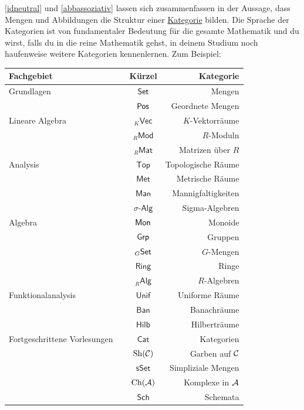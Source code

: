 \begin{vorschau} \label{kategorien}
    \cref{idneutral} und \cref{abbassoziativ} lassen sich zusammenfassen in der Aussage, dass Mengen und Abbildungen die Struktur einer \href{https://ncatlab.org/nlab/show/category}{Kategorie} bilden. Die Sprache der Kategorien ist von fundamentaler Bedeutung für die gesamte Mathematik und du wirst, falls du in die reine Mathematik gehst, in deinem Studium noch haufenweise weitere Kategorien kennenlernen. Zum Beispiel:
    \begin{longtable}{lccr}
    Fachgebiet & \phantom{Platzhalter} & Kürzel & \phantom{Platzhalterhalter} Kategorie \\
    \midrule
    Grundlagen && $\mathsf{Set}$ & Mengen \\ 
    && $\mathsf{Pos}$ & Geordnete Mengen \\[0.5em]
    Lineare Algebra && ${}_K\mathsf{Vec}$ & $K$-Vektorräume \\
    && ${}_R\mathsf{Mod}$ & $R$-Moduln \\
    && ${}_R\mathsf{Mat}$ & Matrizen über $R$ \\[0.5em]
    Analysis && $\mathsf{Top}$ & Topologische Räume \\
    && $\mathsf{Met}$ & Metrische Räume \\
    && $\mathsf{Man}$ & Mannigfaltigkeiten \\
    && $\sigma\textsf{-Alg}$ & Sigma-Algebren \\[0.5em]
    Algebra && $\mathsf{Mon}$ & Monoide \\
    && $\mathsf{Grp}$ & Gruppen \\
    && ${}_G\mathsf{Set}$ & $G$-Mengen \\
    && $\mathsf{Ring}$ & Ringe \\
    && ${}_R\mathsf{Alg}$ & $R$-Algebren \\[0.5em]
    Funktionalanalysis && $\mathsf{Unif}$ & Uniforme Räume \\
    && $\mathsf{Ban}$ & Banachräume \\
    && $\mathsf{Hilb}$ & Hilberträume \\[0.5em]
    Fortgeschrittene Vorlesungen && $\mathsf{Cat}$ & Kategorien \\
    && $\mathrm{Sh}(\mathcal C)$ & Garben auf $\mathcal C$ \\
    && $\mathsf{sSet}$ & Simpliziale Mengen \\
    && $\mathrm{Ch}(\mathcal A)$ & Komplexe in $\mathcal A$ \\
    && $\mathsf{Sch}$ & Schemata \\
    \end{longtable}
\end{vorschau}


